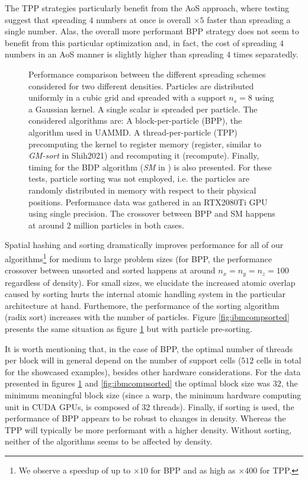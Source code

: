\documentclass[ twoside,openright,titlepage,numbers=noenddot,%
headinclude,footinclude,cleardoublepage=empty,abstract=on,
BCOR=5mm,paper=a4,fontsize=11pt, dvipsnames
]{scrreprt}
\newcommand{\uammd}{\gls{UAMMD}\xspace}
\newcommand{\gpu}{\gls{GPU}\xspace}
\begin{document}
The TPP strategies particularly benefit from the AoS approach, where testing suggest that spreading $4$ numbers at once is overall $\times 5$ faster than spreading a single number. Alas, the overall more performant BPP strategy does not seem to benefit from this particular optimization and, in fact, the cost of spreading $4$ numbers in an AoS manner is slightly higher than spreading $4$ times separatedly.
\begin{figure}[h]
  \centering
\caption{Performance comparison between the different spreading schemes considered for two different densities. Particles are distributed uniformly in a cubic grid and spreaded with a support $n_s=8$ using a Gaussian kernel. A single scalar is spreaded per particle. The considered algorithms are: A block-per-particle (BPP), the algorithm used in \uammd. A thread-per-particle (TPP) precomputing the kernel to register memory (register, similar to \emph{GM-sort} in Shih2021\cite{Shih2021}) and recomputing it (recompute). Finally, timing for the BDP algorithm (\emph{SM} in \cite{Shih2021}) is also presented. For these tests, particle sorting was not employed, i.e. the particles are randomly distributed in memory with respect to their physical positions. Performance data was gathered in an RTX2080Ti \gpu using single precision. The crossover between BPP and SM happens at around $2$ million particles in both cases.}
\label{fig:ibmcomp}
\end{figure}

Spatial hashing and sorting dramatically improves performance for all of our algorithms\footnote{We observe a speedup of up to $\times 10$ for BPP and as high as $\times 400$ for TPP.} for medium to large problem sizes (for BPP, the performance crossover between unsorted and sorted happens at around $n_x=n_y=n_z=100$ regardless of density). For small sizes, we elucidate the increased atomic overlap caused by sorting hurts the internal atomic handling system in the particular architecture at hand. Furthemore, the performance of the sorting algorithm (radix sort) increases with the number of particles. Figure \ref{fig:ibmcompsorted} presents the same situation as figure \ref{fig:ibmcomp} but with particle pre-sorting.

It is worth mentioning that, in the case of BPP, the optimal number of threads per block will in general depend on the number of support cells ($512$ cells in total for the showcased examples), besides other hardware considerations. For the data presented in figures \ref{fig:ibmcomp} and \ref{fig:ibmcompsorted} the optimal block size was $32$, the minimum meaningful block size (since a warp, the minimum hardware computing unit in CUDA GPUs, is composed of $32$ threads).
Finally, if sorting is used, the performance of BPP appears to be robust to changes in density. Whereas the TPP will typically be more performant with a higher density. Without sorting, neither of the algorithms seems to be affected by density.
\end{document}
